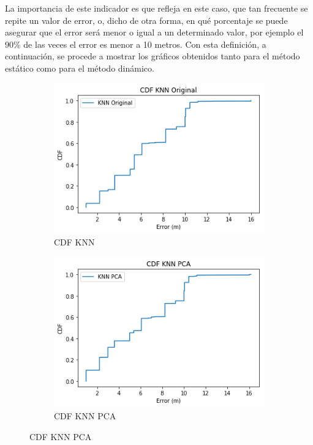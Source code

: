 La importancia de este indicador es que refleja en este caso, que tan frecuente se repite un valor de error, o, dicho de otra forma, en qué porcentaje se puede asegurar que el error será menor o igual a un determinado valor, por ejemplo el 90\% de las veces el error es menor a 10 metros. Con esta definición, a continuación, se procede a mostrar los gráficos obtenidos tanto para el método estático como para el método dinámico.

\begin{figure}[ht!]
\centering
\begin{subfigure}{.5\textwidth}
  \centering
  \includegraphics[width=.8\linewidth]{figures/cdf-knn-dinamico.png}
  \caption{CDF KNN}
  \label{fig:sub1}
\end{subfigure}%
\begin{subfigure}{.5\textwidth}
  \centering
  \includegraphics[width=.8\linewidth]{figures/cdf-knnPCA-dinamico.png}
  \caption{CDF KNN PCA}
  \label{fig:sub2}
\end{subfigure}


\end{figure}
